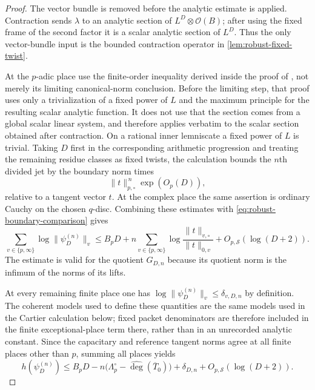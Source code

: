 \documentclass[11pt]{article}
\theoremstyle{definition}
\theoremstyle{remark}
\newcommand{\calO}{\mathcal O}
\newcommand{\widehatdeg}{\widehat{\deg}}
\begin{document}
\begin{proof}
The vector bundle is removed before the analytic estimate is applied.
Contraction sends $\lambda$ to an analytic section of
$L^D\otimes\calO(B)$; after using the fixed frame of the second factor it is
a scalar analytic section of $L^D$.  Thus the only vector-bundle input is the
bounded contraction operator in \cref{lem:robust-fixed-twist}.

At the $p$-adic place use the finite-order inequality derived inside the
proof of \cite[Proposition~5.15]{BostChambertLoir2009}, not merely its
limiting canonical-norm conclusion.  Before the limiting step, that proof uses
only a trivialization of a fixed power of $L$ and the maximum principle for
the resulting scalar analytic function.  It does not use that the section
comes from a global scalar linear system, and therefore applies verbatim to
the scalar section obtained after contraction.  On a rational inner
lemniscate a fixed power of $L$ is trivial.  Taking $D$ first in the
corresponding arithmetic progression and treating the remaining residue
classes as fixed twists, the calculation bounds the $n$th divided jet by the
boundary norm times
\[
 \|t\|_{p,\circ}^{\,n}\exp(O_p(D)),
\]
relative to a tangent vector $t$.  At the complex place the same assertion is
ordinary Cauchy on the chosen $q$-disc.  Combining these estimates with
\eqref{eq:robust-boundary-comparison} gives
\begin{equation}\label{eq:robust-local-analytic}
 \sum_{v\in\{p,\infty\}}\log\|\psi_D^{(n)}\|_v
 \le B_pD
 +n\sum_{v\in\{p,\infty\}}
   \log\frac{\|t\|_{v,\circ}}{\|t\|_{0,v}}
 +O_{p,\mathcal S}(\log(D+2)).
\end{equation}
The estimate is valid for the quotient $G_{D,n}$ because its quotient norm is
the infimum of the norms of its lifts.

At every remaining finite place one has
$\log\|\psi_D^{(n)}\|_v\le\delta_{v,D,n}$ by definition.  The coherent
models used to define these quantities are the same models used in the
Cartier calculation below; fixed packet denominators are therefore included
in the finite exceptional-place term there, rather than in an unrecorded
analytic constant.  Since the capacitary and reference tangent norms agree at
all finite places other than $p$, summing all places yields
\begin{equation}\label{eq:robust-height}
 h(\psi_D^{(n)})
 \le B_pD-n\bigl(\Lambda_p^\circ-
                   \widehatdeg(\overline T_0)\bigr)
      +\delta_{D,n}+O_{p,\mathcal S}(\log(D+2)).
\end{equation}


\end{proof}
\end{document}
